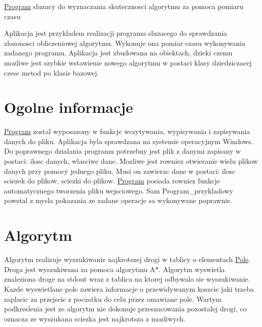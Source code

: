 \hyperlink{class_program}{Program} sluzacy do wyznaczania skutecznosci algorytmu za pomoca pomiaru czasu

Aplikacja jest przykladem realizacji programu sluzacego do sprawdzania zlozonosci obliczeniowej algorytmu. Wykonuje ona pomiar czasu wykonywania zadanego programu. Aplikacja jest zbudowana na obiektach, dzieki czemu mozliwe jest szybkie wstawienie nowego algorytmu w postaci klasy dziedziczacej czesc metod po klasie bazowej.\hypertarget{index_etykieta-ogolne-informacje}{}\section{Ogolne informacje}\label{index_etykieta-ogolne-informacje}
\hyperlink{class_program}{Program} zostal wyposazony w funkcje wczytywania, wypisywania i zapisywania danych do pliku. Aplikacja byla sprawdzana na systemie operacyjnym Windows. Do poprawnego dzialania programu potrzebny jest plik z danymi zapisany w postaci\+: ilosc danych, wlasciwe dane. Mozliwe jest rowniez otwieranie wielu plikow danych przy pomocy jednego pliku. Musi on zawierac dane w postaci\+: ilosc sciezek do plikow, sciezki do plikow. \hyperlink{class_program}{Program} posiada rowniez funkcje automatycznego tworzenia pliku wejsciowego. Sam Program\+\_\+przykladowy powstal z mysla pokazania ze zadane operacje sa wykonywane poprawnie.\hypertarget{index_etykieta-algortym}{}\section{Algorytm}\label{index_etykieta-algortym}
Algorytm realizuje wyszukiwanie najkrotszej drogi w tablicy o elementach \hyperlink{class_pole}{Pole}. Droga jest wyszukiwana za pomoca algorytmu A$\ast$. Algorytm wyswietla znaleziona droge na stdout wraz z tablica na ktorej odbywalo sie wyszukiwanie. Kazde wyswietlane pole zawiera informacje o przewidywanym koszcie jaki trzeba zaplacic za przejscie z poczatku do celu przez omawiane pole. Wartym podkreslenia jest ze algorytm nie dokonuje przeszacowania pozostalej drogi, co oznacza ze wyszukana sciezka jest najkrotsza z mozliwych. 